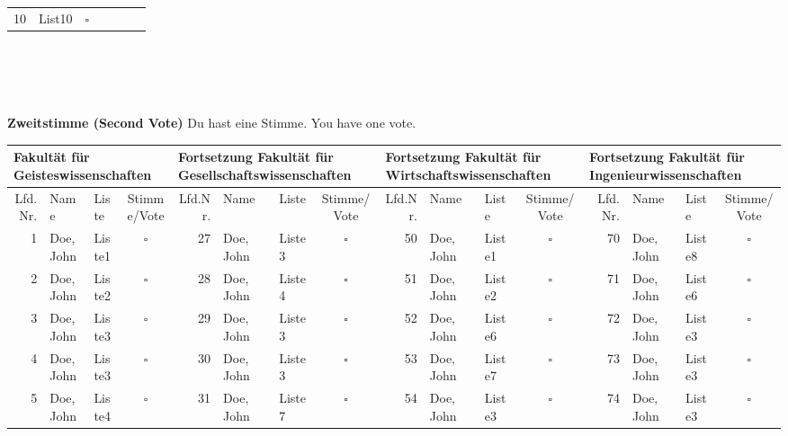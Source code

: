 \documentclass[english,ngerman,10pt]{article}
\begin{document}
{{\begin{tabular}{r l c l l l l }
10		& List10										&$\square$				&	&													&	\\
\end{tabular}
\\
\\
\\
\\
\textbf{{\large Zweitstimme (Second Vote)}} \newline
Du hast eine Stimme. \newline
You have one vote.} \newline
\newline
\small{
\begin{tabular}{|r | l | l | c || r | l | l | c || r | l | l | c || r | l | l | c |}
\multicolumn{4}{l}{\textbf{Fakultät für Geisteswissenschaften}} &
\multicolumn{4}{l}{\textbf{Fortsetzung Fakultät für Gesellschaftswissenschaften}} &
\multicolumn{4}{l}{\textbf{Fortsetzung Fakultät für Wirtschaftswissenschaften}} &
\multicolumn{4}{l}{\textbf{Fortsetzung Fakultät für Ingenieurwissenschaften}} \\ \hline
Lfd.Nr.	& Name 					& Liste 		& Stimme/Vote 	& Lfd.Nr. 	& Name 				& Liste 		& Stimme/Vote 	& Lfd.Nr. 	& Name 					& Liste 	& Stimme/Vote 	& Lfd.Nr.	& Name & Liste & Stimme/Vote \\ \hline
1		& Doe, John				& Liste1		&$\square$ 		& 	27		& Doe, John			& Liste3		&$\square$		&	50		& Doe, John				& Liste1	&$\square$ 		&70    		& Doe, John	 	 & Liste8	&$\square$\\ \hline

2		& Doe, John				& Liste2		&$\square$		& 	28		& Doe, John			& Liste4		&$\square$		&	51		& Doe, John				& Liste2	&$\square$		&71			& Doe, John		& Liste6	&$\square$\\ \hline

3		& Doe, John				& Liste3		&$\square$		&	29		& Doe, John			& Liste3		&$\square$		&	52		& Doe, John				& Liste6	&$\square$		&72			& Doe, John		& Liste3	&$\square$\\ \hline

4		& Doe, John				& Liste3		&$\square$		&	30		& Doe, John			& Liste3		&$\square$		&	53		& Doe, John				& Liste7	&$\square$		&73			& Doe, John		& Liste3	&$\square$\\ \hline

5		& Doe, John				& Liste4		&$\square$		&	31		& Doe, John			& Liste7		&$\square$ 		&	54		& Doe, John				& Liste3&	$\square$		&74			& Doe, John		& Liste3	&$\square$\\ \hline


\end{tabular}}}
\end{document}
